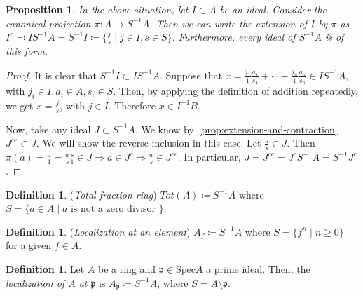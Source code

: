 \documentclass[11pt]{article}
\newtheorem{prop}[theorem]{Proposition}
\theoremstyle{definition}
\newtheorem{defn}[theorem]{Definition}
\begin{document}
        \begin{prop} \label{prop:extension-in-fractions}
            In the above situation, let $I \subset A$ be an ideal.
            Consider the canonical projection $\pi: A \rightarrow S^{-1}A$.
            Then we can write the extension of $I$ by $\pi$ as
            $I^{e} \eqqcolon IS^{-1}A = S^{-1}I \coloneqq \{\frac{j}{s} \mid j \in I, s \in S \}$.
            Furthermore, every ideal of $S^{-1}A$ is of this form.
        \end{prop}
            \begin{proof}
                    It is clear that $S^{-1}I \subset IS^{-1}A$.
                    Suppose that $x = \frac{j_1}{1} \frac{a_1}{s_1} + \cdots + \frac{j_n}{1} \frac{a_n}{s_n} \in IS^{-1}A$,
                    with $j_i \in I, a_i \in A, s_i \in S$.
                    Then, by applying the definition of addition repeatedly, we get
                    $x = \frac{j}{s}$, with $j \in I$.
                    Therefore $x \in I^{-1}B$.

                    \noindent Now, take any ideal $J \subset S^{-1}A$.
                    We know by~\ref{prop:extension-and-contraction} $J^{ce} \subset J$.
                    We will show the reverse inclusion in this case.
                    Let $\frac{a}{s} \in J.$ Then $\pi(a) = \frac{a}{1} = \frac{a}{s} \frac{s}{1} \in J \Rightarrow a \in J^c \Rightarrow \frac{a}{s} \in J^{ce} $.
                    In particular, $J = J^{ce} = J^{c}S^{-1}A = S^{-1}J^{c}$.
                    \end{proof}

        \begin{defn}
            (\emph{Total fraction ring}) $Tot(A) \coloneqq S^{-1}A$ where $S = \{a \in A \mid a \text{ is not a zero divisor }\}$.
        \end{defn}

        \begin{defn}
            (\emph{Localization at an element}) $A_f \coloneqq S^{-1}A$ where $S = \{f^n \mid n \geq 0\}$ for a given $f \in A$.
        \end{defn}

        \begin{defn}
            Let $A$ be a ring and $\mathfrak{p} \in \text{Spec}A$ a prime ideal.
            Then, the \emph{localization of $A$ at $\mathfrak{p}$} is $A_{\mathfrak{p}} \coloneqq S^{-1}A$, where $S = A \setminus \mathfrak{p}$.
        \end{defn}
\end{document}
